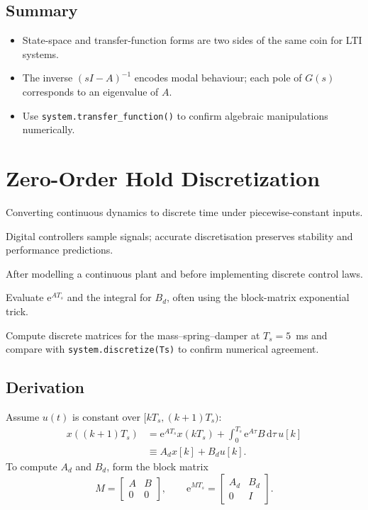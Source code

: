 \subsection{Summary}
\begin{itemize}[leftmargin=*]
    \item State-space and transfer-function forms are two sides of the same coin for LTI systems.
    \item The inverse $(sI - A)^{-1}$ encodes modal behaviour; each pole of $G(s)$ corresponds to an eigenvalue of $A$.
    \item Use \texttt{system.transfer\_function()} to confirm algebraic manipulations numerically.
\end{itemize}

\section{Zero-Order Hold Discretization}
\begin{beginnerguide}
    \item[\textbf{What?}] Converting continuous dynamics to discrete time under piecewise-constant inputs.
    \item[\textbf{Why?}] Digital controllers sample signals; accurate discretisation preserves stability and performance predictions.
    \item[\textbf{When?}] After modelling a continuous plant and before implementing discrete control laws.
    \item[\textbf{How?}] Evaluate $\mathrm{e}^{A T_s}$ and the integral for $B_d$, often using the block-matrix exponential trick.
    \item[\textbf{Example}] Compute discrete matrices for the mass--spring--damper at $T_s=5$~ms and compare with \texttt{system.discretize(Ts)} to confirm numerical agreement.
\end{beginnerguide}
\subsection{Derivation}
Assume $u(t)$ is constant over $[kT_s, (k+1)T_s)$:
\begin{align*}
    x((k+1)T_s) &= \mathrm{e}^{A T_s} x(kT_s) + \int_{0}^{T_s} \mathrm{e}^{A \tau} B\,\mathrm{d}\tau\, u[k]\\
    &\equiv A_d x[k] + B_d u[k].
\end{align*}
To compute $A_d$ and $B_d$, form the block matrix
\[
    M = \begin{bmatrix} A & B \\ 0 & 0 \end{bmatrix}, \qquad
    \mathrm{e}^{M T_s} = \begin{bmatrix} A_d & B_d \\ 0 & I \end{bmatrix}.
\]

